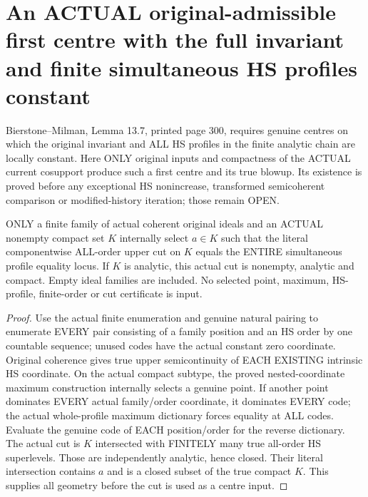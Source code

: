 \section{An ACTUAL original-admissible first centre with the full invariant and finite simultaneous HS profiles constant}

Bierstone--Milman\cite{bierstone-milman97-invent-math}, Lemma 13.7,
printed page 300, requires genuine centres on which the original invariant
and ALL HS profiles in the finite analytic chain are locally constant.
Here ONLY original inputs and compactness of the ACTUAL current cosupport
produce such a first centre and its true blowup. Its existence is proved
before any exceptional HS nonincrease, transformed semicoherent comparison
or modified-history iteration; those remain OPEN.

\begin{lemma}
\label{hir:actual-finite-family-compact-all-hs-constant-cut}
\leanok
ONLY a finite family of actual coherent original ideals and an ACTUAL
nonempty compact set $K$ internally select $a\in K$ such that the literal
componentwise ALL-order upper cut on $K$ equals the ENTIRE simultaneous
profile equality locus. If $K$ is analytic, this actual cut is nonempty,
analytic and compact. Empty ideal families are included. No selected point,
maximum, HS-profile, finite-order or cut certificate is input.
\end{lemma}
\begin{proof}
Use the actual finite enumeration and genuine natural pairing to enumerate
EVERY pair consisting of a family position and an HS order by one countable
sequence; unused codes have the actual constant zero coordinate. Original
coherence gives true upper semicontinuity of EACH EXISTING intrinsic HS
coordinate. On the actual compact subtype, the proved nested-coordinate
maximum construction internally selects a genuine point. If another point
dominates EVERY actual family/order coordinate, it dominates EVERY code;
the actual whole-profile maximum dictionary forces equality at ALL codes.
Evaluate the genuine code of EACH position/order for the reverse dictionary.
The actual cut is $K$ intersected with FINITELY many true all-order HS
superlevels. Those are independently analytic, hence closed. Their literal
intersection contains $a$ and is a closed subset of the true compact $K$.
This supplies all geometry before the cut is used as a centre input.
\end{proof}

